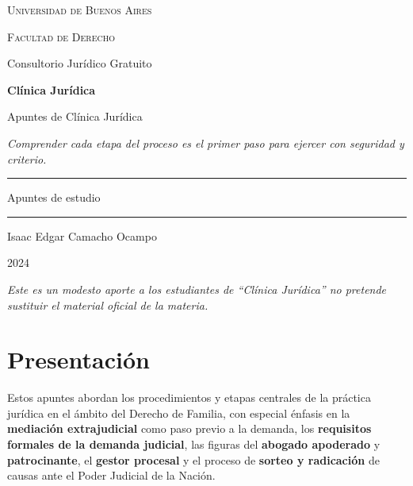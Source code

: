 \documentclass[12pt,oneside]{book}
\newcommand{\universidad}{Universidad de Buenos Aires}
\newcommand{\facultad}{Facultad de Derecho}
\newcommand{\carrera}{Consultorio Jurídico Gratuito}
\newcommand{\materia}{Clínica Jurídica}
\newcommand{\titulo}{Apuntes de Clínica Jurídica}
\newcommand{\autor}{Isaac Edgar Camacho Ocampo}
\newcommand{\anio}{2024}
\begin{document}
\begin{titlepage}
\thispagestyle{empty}
\begin{center}
\vspace*{1cm}
{\large \textsc{\universidad}}

\vspace{0.2cm}
{\large \textsc{\facultad}}

\vspace{0.2cm}
{\large \carrera}

\vspace{3cm}
{\Huge \textbf{\materia}}

\vspace{1cm}
{\LARGE \titulo}

\vspace{0.8cm}
\textit{Comprender cada etapa del proceso es el primer paso para ejercer con seguridad y criterio.}

\vspace{1.2cm}
\rule{0.70\textwidth}{0.5pt}

\vspace{0.5cm}
{\large Apuntes de estudio}

\vspace{0.5cm}
\rule{0.70\textwidth}{0.5pt}

\vfill
{\large \autor}

\vspace{0.3cm}
{\large \anio}
\end{center}
\vfill
\begin{flushleft}
\textit{Este es un modesto aporte a los estudiantes de ``Clínica Jurídica'' no pretende sustituir el material oficial de la materia.}
\end{flushleft}
\end{titlepage}

\tableofcontents

\chapter*{Presentación}

Estos apuntes abordan los procedimientos y etapas centrales de la práctica jurídica en el ámbito del Derecho de Familia, con especial énfasis en la \textbf{mediación extrajudicial} como paso previo a la demanda, los \textbf{requisitos formales de la demanda judicial}, las figuras del \textbf{abogado apoderado} y \textbf{patrocinante}, el \textbf{gestor procesal} y el proceso de \textbf{sorteo y radicación} de causas ante el Poder Judicial de la Nación.
\end{document}
